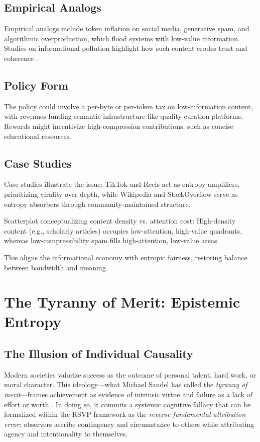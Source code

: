 \documentclass[12pt]{article}
\begin{document}
\subsection{Empirical Analogs}
Empirical analogs include token inflation on social media, generative spam, and algorithmic overproduction, which flood systems with low-value information. Studies on informational pollution highlight how such content erodes trust and coherence \citep{floridi2015information, ormondroyd2009information}.

\subsection{Policy Form}
The policy could involve a per-byte or per-token tax on low-information content, with revenues funding semantic infrastructure like quality curation platforms. Rewards might incentivize high-compression contributions, such as concise educational resources.

\subsection{Case Studies}
Case studies illustrate the issue: TikTok and Reels act as entropy amplifiers, prioritizing virality over depth, while Wikipedia and StackOverflow serve as entropy absorbers through community-maintained structure.

\begin{center}
Scatterplot conceptualizing content density vs. attention cost: High-density content (e.g., scholarly articles) occupies low-attention, high-value quadrants, whereas low-compressibility spam fills high-attention, low-value areas.
\end{center}

This aligns the informational economy with entropic fairness, restoring balance between bandwidth and meaning.

\section{The Tyranny of Merit: Epistemic Entropy}
\label{sec:tyranny-of-merit}

\subsection{The Illusion of Individual Causality}
Modern societies valorize success as the outcome of personal talent, hard work, or moral character. This ideology—what Michael Sandel has called the \emph{tyranny of merit}—frames achievement as evidence of intrinsic virtue and failure as a lack of effort or worth \citep{sandel2020tyranny}. In doing so, it commits a systemic cognitive fallacy that can be formalized within the RSVP framework as the \emph{reverse fundamental attribution error}: observers ascribe contingency and circumstance to others while attributing agency and intentionality to themselves.
\end{document}
